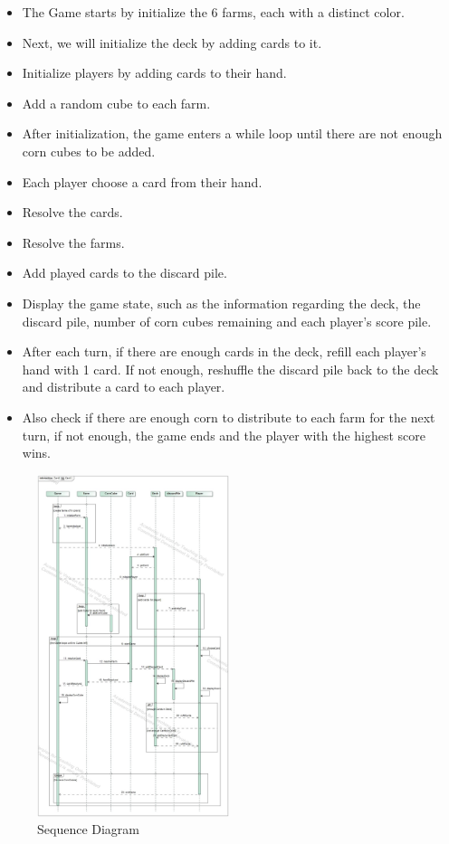 \documentclass[conference]{IEEEtran}
\begin{document}
\begin{itemize}
    \item The Game starts by initialize the 6 farms, each with a distinct color.
    \item Next, we will initialize the deck by adding cards to it.
    \item Initialize players by adding cards to their hand.
    \item Add a random cube to each farm.
    \item After initialization, the game enters a while loop until there are not enough corn cubes to be added.
    \item Each player choose a card from their hand.
    \item Resolve the cards.
    \item Resolve the farms.
    \item Add played cards to the discard pile.
    \item Display the game state, such as the information regarding the deck, the discard pile, number of corn cubes remaining and each player's score pile.
    \item After each turn, if there are enough cards in the deck, refill each player's hand with 1 card. If not enough, reshuffle the discard pile back to the deck and distribute a card to each player.
    \item Also check if there are enough corn to distribute to each farm for the next turn, if not enough, the game ends and the player with the highest score wins.
\end{itemize}

\begin{figure}[h!]
    \centering
    \includegraphics[width=0.5\textwidth]{img/Java Board Game Sequence Diagram.jpeg} %
    \caption{Sequence Diagram}
    \label{fig:sequence-diagram}
\end{figure}
\end{document}
